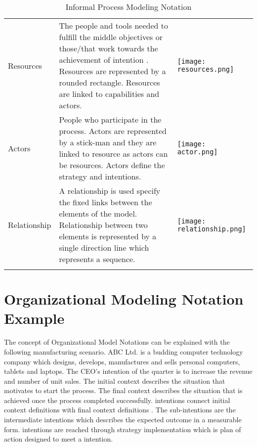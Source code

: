 \begin{center}
\begin{longtable}{p{3cm}p{10cm}p{3cm}}
		Resources					& The people and tools needed to fulfill the middle objectives or those/that work towards the achievement of intention . Resources are represented by a rounded rectangle. Resources are linked to capabilities and actors. & \begin{center} \texttt{[image: resources.png]} \end{center}   \\
		
		Actors					& People who participate in the process. Actors are represented by a stick-man and they are linked to resource as actors can be resources. Actors define the strategy and intentions.  & \begin{center} \texttt{[image: actor.png]} \end{center}   \\
		
		Relationship				& A relationship is used specify the fixed links between the elements of the model. Relationship between two elements is represented by a single direction line which represents a sequence.  & \begin{center} \texttt{[image: relationship.png]} \end{center}   \\
		
		
		\bottomrule
		\caption{Informal Process Modeling Notation}
		\label{tab:notations}		
	\end{longtable}	
\end{center}


\section{Organizational Modeling Notation Example}
\label{sec:orgmodelnotationexample}
\hspace{4ex} The concept of Organizational Model Notations can be explained with the following manufacturing scenario. ABC Ltd. is a budding computer technology company which designs, develops, manufactures and sells personal computers, tablets and laptops. The CEO's intention of the quarter is to increase the revenue and number of unit sales. The initial context describes the situation that motivates to start the process. The final context describes the situation that is achieved once the process completed successfully. intentions connect initial context definitions with final context definitions \cite{Sungur2014a}. The sub-intentions are the intermediate intentions which describes the expected outcome in a measurable form. intentions are reached through strategy implementation which is plan of action designed to meet a intention. 

